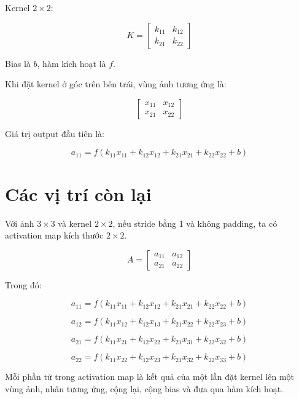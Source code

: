 \documentclass[12pt,a4paper]{report}
\begin{document}
Kernel $2\times2$:

\[
    K =
    \begin{bmatrix}
    k_{11} & k_{12}\\
    k_{21} & k_{22}
    \end{bmatrix}
\]

Bias là $b$, hàm kích hoạt là $f$.

Khi đặt kernel ở góc trên bên trái, vùng ảnh tương ứng là:

\[
    \begin{bmatrix}
    x_{11} & x_{12}\\
    x_{21} & x_{22}
    \end{bmatrix}
\]

Giá trị output đầu tiên là:

\[
    a_{11}
    =
    f(
    k_{11}x_{11}
    +
    k_{12}x_{12}
    +
    k_{21}x_{21}
    +
    k_{22}x_{22}
    +
    b
    )
\]

\section{Các vị trí còn lại}

Với ảnh $3\times3$ và kernel $2\times2$, nếu stride bằng 1 và không padding, ta có activation map kích thước $2\times2$.

\[
    A =
    \begin{bmatrix}
    a_{11} & a_{12}\\
    a_{21} & a_{22}
    \end{bmatrix}
\]

Trong đó:

\[
    a_{11}
    =
    f(
    k_{11}x_{11}
    +
    k_{12}x_{12}
    +
    k_{21}x_{21}
    +
    k_{22}x_{22}
    +
    b
    )
\]

\[
    a_{12}
    =
    f(
    k_{11}x_{12}
    +
    k_{12}x_{13}
    +
    k_{21}x_{22}
    +
    k_{22}x_{23}
    +
    b
    )
\]

\[
    a_{21}
    =
    f(
    k_{11}x_{21}
    +
    k_{12}x_{22}
    +
    k_{21}x_{31}
    +
    k_{22}x_{32}
    +
    b
    )
\]

\[
    a_{22}
    =
    f(
    k_{11}x_{22}
    +
    k_{12}x_{23}
    +
    k_{21}x_{32}
    +
    k_{22}x_{33}
    +
    b
    )
\]

\begin{ghinho}
Mỗi phần tử trong activation map là kết quả của một lần đặt kernel lên một vùng ảnh, nhân tương ứng, cộng lại, cộng bias và đưa qua hàm kích hoạt.
\end{ghinho}
\end{document}
